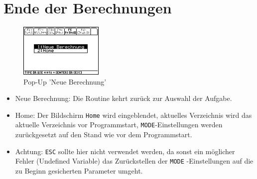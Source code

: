 \documentclass[a5paper,9pt]{scrreprt}
\begin{document}
\section{Ende der Berechnungen}
\begin{figure}[h]
  \centering
  \includegraphics[width=4cm]{img/nummeth_image048.png}
  \caption{Pop-Up 'Neue Berechnung’}
  \label{fig:NeueBerechnung}
\end{figure}
\begin{itemize}
  \item Neue Berechnung: Die Routine kehrt zur\"uck zur Auswahl der Aufgabe.
  \item Home: Der Bildschirm \verb|Home| wird eingeblendet, aktuelles Verzeichnis wird das aktuelle Verzeichnis vor Programmstart, \verb|MODE|-Einstellungen werden zur\"uckgesetzt auf den Stand wie vor dem Programmstart.
  \item Achtung: \verb|ESC| sollte hier nicht verwendet werden, da sonst ein m\"oglicher Fehler (Undefined Variable) das Zur\"uckstellen der \verb|MODE| -Einstellungen auf die zu Beginn gesicherten Parameter umgeht.
\end{itemize}
\end{document}
